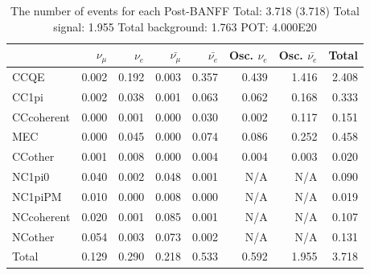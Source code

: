 
\begin{table}
\center
\begin{tabular} { | l ||r | r | r | r | r | r | | r | }
\hline
              & $\nu_\mu$            & $\nu_e$              & $\bar{\nu_\mu}$      & $\bar{\nu_e}$        & Osc. $\nu_e$         & Osc. $\bar{\nu_e}$   & Total                \\ \hline\hline
 CCQE         & 0.002                & 0.192                & 0.003                & 0.357                & 0.439                & 1.416                & 2.408                \\ \hline
 CC1pi        & 0.002                & 0.038                & 0.001                & 0.063                & 0.062                & 0.168                & 0.333                \\ \hline
 CCcoherent   & 0.000                & 0.001                & 0.000                & 0.030                & 0.002                & 0.117                & 0.151                \\ \hline
 MEC          & 0.000                & 0.045                & 0.000                & 0.074                & 0.086                & 0.252                & 0.458                \\ \hline
 CCother      & 0.001                & 0.008                & 0.000                & 0.004                & 0.004                & 0.003                & 0.020                \\ \hline
 NC1pi0       & 0.040                & 0.002                & 0.048                & 0.001                & N/A                  & N/A                  & 0.090                \\ \hline
 NC1piPM      & 0.010                & 0.000                & 0.008                & 0.000                & N/A                  & N/A                  & 0.019                \\ \hline
 NCcoherent   & 0.020                & 0.001                & 0.085                & 0.001                & N/A                  & N/A                  & 0.107                \\ \hline
 NCother      & 0.054                & 0.003                & 0.073                & 0.002                & N/A                  & N/A                  & 0.131                \\ \hline
\hline
 Total        & 0.129                & 0.290                & 0.218                & 0.533                & 0.592                & 1.955                & 3.718                \\ \hline
\end{tabular}
\caption{
The number of events for each 
Post-BANFF
Total: 3.718    (3.718)
Total signal: 1.955
Total background: 1.763
POT: 4.000E20
}
\label{tab:ciao}
\end{table}


